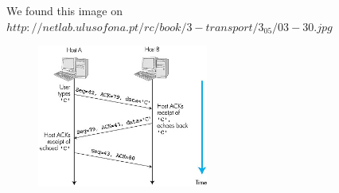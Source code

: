 We found this image on $http://netlab.ulusofona.pt/rc/book/3-transport/3_05/03-30.jpg$
\begin{figure}[!ht]
  \centering
    \includegraphics[width=0.5\textwidth]{images/telnet.jpg}
\end{figure}
